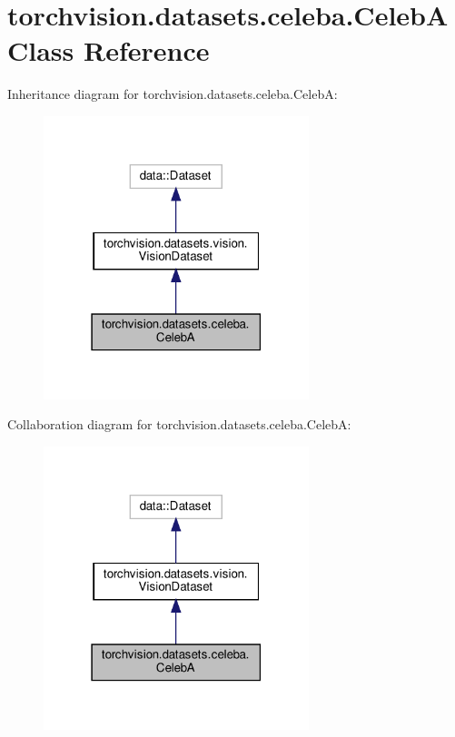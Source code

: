 \hypertarget{classtorchvision_1_1datasets_1_1celeba_1_1CelebA}{}\section{torchvision.\+datasets.\+celeba.\+CelebA Class Reference}
\label{classtorchvision_1_1datasets_1_1celeba_1_1CelebA}


Inheritance diagram for torchvision.\+datasets.\+celeba.\+CelebA\+:
\nopagebreak
\begin{figure}[H]
\begin{center}
\leavevmode
\includegraphics[width=219pt]{classtorchvision_1_1datasets_1_1celeba_1_1CelebA__inherit__graph}
\end{center}
\end{figure}


Collaboration diagram for torchvision.\+datasets.\+celeba.\+CelebA\+:
\nopagebreak
\begin{figure}[H]
\begin{center}
\leavevmode
\includegraphics[width=219pt]{classtorchvision_1_1datasets_1_1celeba_1_1CelebA__coll__graph}
\end{center}
\end{figure}
